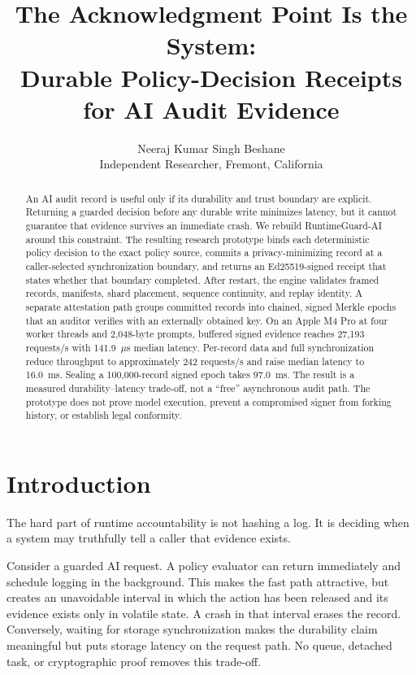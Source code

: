 \documentclass[10pt,twocolumn]{article}
\title{The Acknowledgment Point Is the System:\\Durable Policy-Decision Receipts for AI Audit Evidence}
\author{Neeraj Kumar Singh Beshane\\Independent Researcher, Fremont, California}
\date{}
\begin{document}
\maketitle

\begin{abstract}
An AI audit record is useful only if its durability and trust boundary are explicit. Returning a guarded decision before any durable write minimizes latency, but it cannot guarantee that evidence survives an immediate crash. We rebuild RuntimeGuard-AI around this constraint. The resulting research prototype binds each deterministic policy decision to the exact policy source, commits a privacy-minimizing record at a caller-selected synchronization boundary, and returns an Ed25519-signed receipt that states whether that boundary completed. After restart, the engine validates framed records, manifests, shard placement, sequence continuity, and replay identity. A separate attestation path groups committed records into chained, signed Merkle epochs that an auditor verifies with an externally obtained key. On an Apple M4 Pro at four worker threads and 2,048-byte prompts, buffered signed evidence reaches 27,193 requests/s with 141.9~$\mu$s median latency. Per-record data and full synchronization reduce throughput to approximately 242 requests/s and raise median latency to 16.0~ms. Sealing a 100,000-record signed epoch takes 97.0~ms. The result is a measured durability--latency trade-off, not a ``free'' asynchronous audit path. The prototype does not prove model execution, prevent a compromised signer from forking history, or establish legal conformity.
\end{abstract}

\section{Introduction}
The hard part of runtime accountability is not hashing a log. It is deciding when a system may truthfully tell a caller that evidence exists.

Consider a guarded AI request. A policy evaluator can return immediately and schedule logging in the background. This makes the fast path attractive, but creates an unavoidable interval in which the action has been released and its evidence exists only in volatile state. A crash in that interval erases the record. Conversely, waiting for storage synchronization makes the durability claim meaningful but puts storage latency on the request path. No queue, detached task, or cryptographic proof removes this trade-off.
\end{document}
